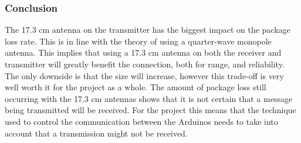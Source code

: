 \subsubsection*{Conclusion}
The 17.3 cm antenna on the transmitter has the biggest impact on the package loss rate.
This is in line with the theory of using a quarter-wave monopole antenna.
This implies that using a 17.3 cm antenna on both the receiver and transmitter will greatly benefit the connection, both for range, and reliability.
The only downside is that the size will increase, however this trade-off is very well worth it for the project as a whole.
The amount of package loss still occurring with the 17.3 cm antennas shows that it is not certain that a message being transmitted will be received.
For the project this means that the technique used to control the communication between the Arduinos needs to take into account that a transmission might not be received.

